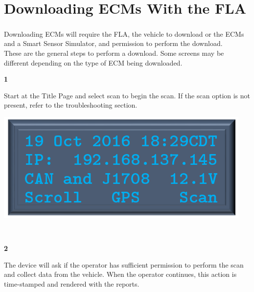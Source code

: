 \documentclass[11pt, oneside]{book}
\begin{document}
\chapter{Downloading ECMs With the FLA}\label{chap:downloading_ecms}
\paragraph{  }
Downloading ECMs will require the FLA, the vehicle to download or the ECMs and a Smart Sensor Simulator, and permission to perform the download.
\\
These are the general steps to perform a download. Some screens may be different depending on the type of ECM being downloaded.
\\[\baselineskip]
\noindent\begin{minipage}{0.45\textwidth}%
\begin{center}
\textbf{1}\\[\baselineskip]
\end{center}
Start at the Title Page and select scan to begin the scan. If the scan option is not present, refer to the troubleshooting section.
\end{minipage}%
\hfill%
\begin{minipage}{0.45\textwidth}
\includegraphics[width=\linewidth]{../media/pstricks_files/01_main_screen_gps}
\end{minipage}
\\[\baselineskip]\noindent\begin{minipage}{0.45\textwidth}%
\begin{center}
\textbf{2}\\[\baselineskip]
\end{center}
The device will ask if the operator has sufficient permission to perform the scan and collect data from the vehicle. When the operator continues, this action is time-stamped and rendered with the reports.
\end{minipage}%
\end{document}
